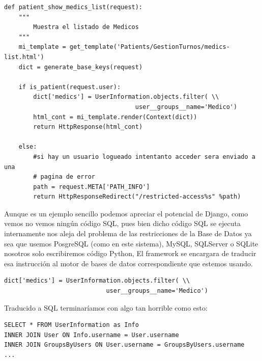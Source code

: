 \begin{lstlisting}[style=Python]
def patient_show_medics_list(request):
    """
        Muestra el listado de Medicos
    """
    mi_template = get_template('Patients/GestionTurnos/medics-list.html')
    dict = generate_base_keys(request)

    if is_patient(request.user):
        dict['medics'] = UserInformation.objects.filter( \\
                                    user__groups__name='Medico')
        html_cont = mi_template.render(Context(dict))
        return HttpResponse(html_cont)

    else:
        #si hay un usuario logueado intentanto acceder sera enviado a una
        # pagina de error
        path = request.META['PATH_INFO']
        return HttpResponseRedirect("/restricted-access%s" %path)
\end{lstlisting}

\vspace{0.1cm}

Aunque es un ejemplo sencillo podemos apreciar el potencial de Django, como vemos no vemos ningún código SQL, pues bien dicho código SQL se ejecuta internamente nos aleja del problema de las restricciones de la Base de Datos ya sea que usemos PosgreSQL (como en este sistema), MySQL, SQLServer o SQLite nosotros solo escribiremos código Python, El framework se encargara de traducir esa instrucción al motor de bases de datos correspondiente que estemos usando.\\[0.2cm]

\begin{lstlisting}[style=consola]
dict['medics'] = UserInformation.objects.filter( \\
                            user__groups__name='Medico')
\end{lstlisting}

\vspace{0.1cm}

Traducido a SQL terminaríamos con algo tan horrible como esto:\\[0.1cm]

\begin{lstlisting}[style=consola]
SELECT * FROM UserInformation as Info
INNER JOIN User ON Info.username = User.username
INNER JOIN GroupsByUsers ON User.username = GroupsByUsers.username
...
\end{lstlisting}

\vspace{0.1cm}


